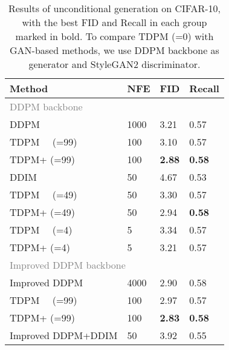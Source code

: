 \documentclass{article} \usepackage{iclr2023_conference,times}
\theoremstyle{plain}
\theoremstyle{definition}
\theoremstyle{remark}
\begin{document}
{\begin{table}[t]
\begin{minipage}[t]{0.48\linewidth}
\centering
\small 
\caption{\small Results of unconditional generation on CIFAR-10, with the best FID and Recall in each group marked in bold. To compare TDPM (=0) with GAN-based methods, we use DDPM backbone as generator and StyleGAN2 discriminator.}\vspace{-2mm}
\label{tab:cifar}
\centering
\begin{tabular}{llll}
\toprule[1.5pt]
Method              & \multicolumn{1}{l}{NFE} & \multicolumn{1}{l}{\!\!FID} & \multicolumn{1}{l}{\!\!\!\!Recall} \\ \hline
\multicolumn{3}{l}{\textcolor{gray}{DDPM backbone}} \\
DDPM          & 1000                    & 3.21                    & 0.57                       \\
TDPM~~ (=99) & 100                     & 3.10                     & 0.57                       \\
TDPM+ (=99) & 100                     & \textbf{2.88}                    & \textbf{0.58 }                      \\ \hdashline
DDIM          & 50                    & 4.67                    & 0.53                       \\
TDPM~~ (=49) & 50                      & 3.30                     & 0.57                       \\
TDPM+ (=49) & 50                      & 2.94                    & \textbf{0.58}                       \\ \hdashline
TDPM~~ (=4)  & 5                       & 3.34                    & 0.57                       \\
TDPM+ (=4)  & 5                       & 3.21                    & 0.57                       \\ \hline
\multicolumn{3}{l}{\textcolor{gray}{Improved DDPM backbone}} \\
Improved DDPM           & 4000                    & 2.90                     & 0.58                       \\
TDPM~~ (=99) & 100                     & 2.97                    & 0.57                       \\
TDPM+ (=99) & 100                     & \textbf{2.83}           &\textbf{0.58}                     \\ \hdashline
Improved DDPM+DDIM          & 50                    & 3.92                    & 0.55                       \\

\end{tabular}
\end{minipage}
\end{table}}
\end{document}
